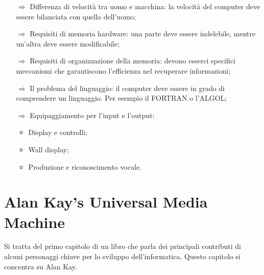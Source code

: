 \begin{itemize}
    \item [$\Rightarrow$] Differenza di velocità tra uomo e macchina: la velocità del computer 
    deve essere bilanciata con quella dell'uomo;
    \item [$\Rightarrow$] Requisiti di memoria hardware: una parte deve essere indelebile, mentre
    un'altra deve essere modificabile;
    \item [$\Rightarrow$] Requisiti di organizzazione della memoria: devono esserci specifici meccanismi
    che garantiscono l'efficienza nel recuperare informazioni;
    \item [$\Rightarrow$] Il problema del linguaggio: il computer deve essere in grado di comprendere
    un linguaggio. Per esempio il FORTRAN o l'ALGOL;
    \item [$\Rightarrow$] Equipaggiamento per l'input e l'output:
    \begin{itemize}
        \item Display e controlli;
        \item Wall display;
        \item Produzione e riconoscimento vocale.
    \end{itemize}
\end{itemize}

\section{Alan Kay's Universal Media Machine}

Si tratta del primo capitolo di un libro che parla dei principali
contributi di alcuni personaggi chiave per lo sviluppo dell'informatica.
Questo capitolo si concentra su Alan Kay.







